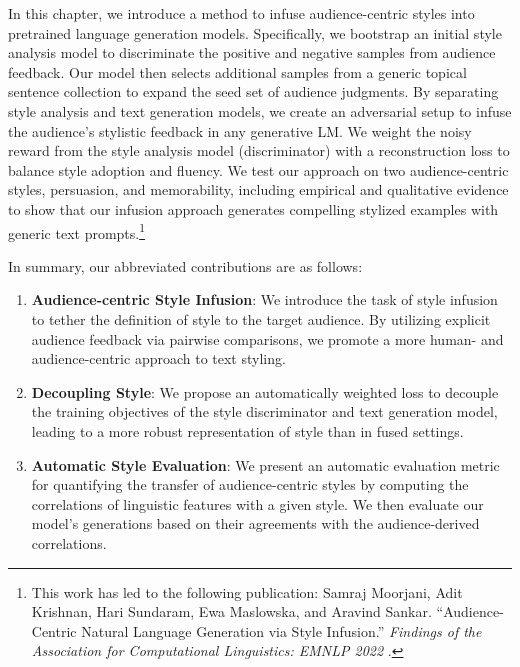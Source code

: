 In this chapter, we introduce a method to infuse audience-centric styles into pretrained language generation models. Specifically, we bootstrap an initial style analysis model to discriminate the positive and negative samples from audience feedback. Our model then selects additional samples from a generic topical sentence collection to expand the seed set of audience judgments. By separating style analysis and text generation models, we create an adversarial setup to infuse the audience's stylistic feedback in any generative LM. We weight the noisy reward from the style analysis model (discriminator) with a reconstruction loss to balance style adoption and fluency. We test our approach on two audience-centric styles, persuasion, and memorability, including empirical and qualitative evidence to show that our infusion approach generates compelling stylized examples with generic text prompts.\footnote{This work has led to the following publication: Samraj Moorjani, Adit Krishnan, Hari Sundaram, Ewa Maslowska, and Aravind Sankar. ``Audience-Centric Natural Language Generation via Style Infusion.'' \textit{Findings of the Association for Computational Linguistics: EMNLP 2022} \citep{moorjani-etal-2022-audience}.}

In summary, our abbreviated contributions are as follows: 
\begin{enumerate}
    \item \textbf{Audience-centric Style Infusion}: We introduce the task of style infusion to tether the definition of style to the target audience. By utilizing explicit audience feedback via pairwise comparisons, we promote a more human- and audience-centric approach to text styling.
    
    \item \textbf{Decoupling Style}: We propose an automatically weighted loss to decouple the training objectives of the style discriminator and text generation model, leading to a more robust representation of style than in fused settings.

    \item \textbf{Automatic Style Evaluation}: We present an automatic evaluation metric for quantifying the transfer of audience-centric styles by computing the correlations of linguistic features with a given style. We then evaluate our model's generations based on their agreements with the audience-derived correlations. 
\end{enumerate}